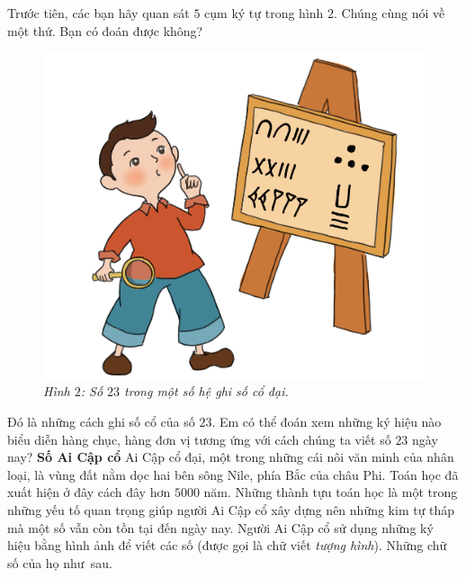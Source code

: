 \begin{multicols}{2}
\begin{figure}[H]
{}
		\vspace*{-15pt}
	\end{figure}
	Trước tiên, các bạn hãy quan sát $5$ cụm ký tự trong hình $2$.  Chúng cùng nói về một thứ. Bạn có đoán được không?
	\vskip 0.1cm
	\begin{figure}[H]
		\centering
		\vspace*{-5pt}
		\captionsetup{labelformat= empty, justification=centering}
		\includegraphics[width=0.8\linewidth]{20.12-pi}
		\caption{\small\textit{\color{toancuabi}Hình $2$: Số $23$ trong một số hệ ghi số cổ đại.}}
		\vspace*{-10pt}
	\end{figure}
	Đó là những cách ghi số cổ của số $23$. Em có thể đoán xem những ký hiệu nào biểu diễn hàng chục, hàng đơn vị tương ứng với cách chúng ta viết số $23$ ngày nay?
	\vskip 0.1cm
	\textbf{\color{toancuabi}Số Ai Cập cổ}
	\vskip 0.1cm
	Ai Cập cổ đại, một trong những cái nôi văn minh của nhân loại, là vùng đất nằm dọc hai bên sông Nile, phía Bắc của châu Phi. Toán học đã xuất hiện ở đây cách đây hơn $5000$ năm. Những thành tựu toán học là một trong những yếu tố quan trọng giúp người Ai Cập cổ xây dựng nên những kim tự tháp mà một số vẫn còn tồn tại đến ngày nay. 
	\vskip 0.1cm
	Người Ai Cập cổ sử dụng những ký hiệu bằng hình ảnh để viết các số (được gọi là chữ viết \textit{tượng hình}). Những chữ số của họ như~sau.
	\end{multicols}
